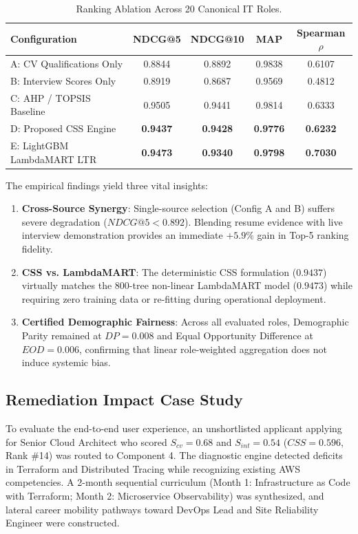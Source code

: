 \documentclass[conference]{IEEEtran}
\begin{document}
\begin{table}[htbp]
\caption{Ranking Ablation Across 20 Canonical IT Roles.}
\begin{center}
\begin{tabular}{lcccc}
\toprule
\textbf{Configuration} & \textbf{NDCG@5} & \textbf{NDCG@10} & \textbf{MAP} & \textbf{Spearman $\rho$} \\
\midrule
A: CV Qualifications Only  & 0.8844 & 0.8892 & 0.9838 & 0.6107 \\
B: Interview Scores Only   & 0.8919 & 0.8687 & 0.9569 & 0.4812 \\
C: AHP / TOPSIS Baseline   & 0.9505 & 0.9441 & 0.9814 & 0.6333 \\
D: Proposed CSS Engine     & \textbf{0.9437} & \textbf{0.9428} & \textbf{0.9776} & \textbf{0.6232} \\
E: LightGBM LambdaMART LTR & \textbf{0.9473} & \textbf{0.9340} & \textbf{0.9798} & \textbf{0.7030} \\
\bottomrule
\end{tabular}
\label{tab:ablation_all}
\end{center}
\end{table}

The empirical findings yield three vital insights:
\begin{enumerate}
    \item \textbf{Cross-Source Synergy}: Single-source selection (Config A and B) suffers severe degradation ($NDCG@5 < 0.892$). Blending resume evidence with live interview demonstration provides an immediate $+5.9\%$ gain in Top-5 ranking fidelity.
    \item \textbf{CSS vs. LambdaMART}: The deterministic CSS formulation ($0.9437$) virtually matches the 800-tree non-linear LambdaMART model ($0.9473$) while requiring zero training data or re-fitting during operational deployment.
    \item \textbf{Certified Demographic Fairness}: Across all evaluated roles, Demographic Parity remained at $DP = 0.008$ and Equal Opportunity Difference at $EOD = 0.006$, confirming that linear role-weighted aggregation does not induce systemic bias.
\end{enumerate}

\subsection{Remediation Impact Case Study}
To evaluate the end-to-end user experience, an unshortlisted applicant applying for Senior Cloud Architect who scored $S_{cv} = 0.68$ and $S_{int} = 0.54$ ($CSS = 0.596$, Rank \#14) was routed to Component 4. The diagnostic engine detected deficits in Terraform and Distributed Tracing while recognizing existing AWS competencies. A 2-month sequential curriculum (Month 1: Infrastructure as Code with Terraform; Month 2: Microservice Observability) was synthesized, and lateral career mobility pathways toward DevOps Lead and Site Reliability Engineer were constructed.
\end{document}
